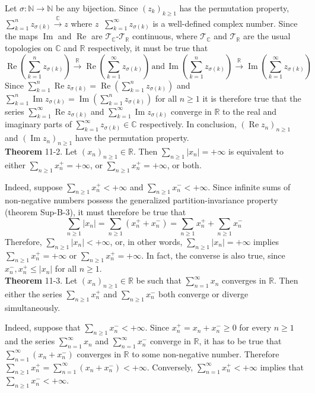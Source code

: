 \documentclass[a4paper]{article}
\newcommand{\brac}[1]{\left ( #1 \right )}
\newcommand{\abs}[1]{\left | #1 \right |}
\newcommand{\Real}{\mathbb{R}}
\newcommand{\Cplx}{\mathbb{C}}
\newcommand{\Tcal}{\mathcal{T}}
\newcommand{\defn}{\mathop{\overset{\Delta}{=}}\nolimits}
\newcommand{\re}{\operatorname{Re}\nolimits}
\newcommand{\im}{\operatorname{Im}\nolimits}
\begin{document}
Let $\sigma:\mathbb{N}\to\mathbb{N}$ be any bijection. Since $\brac{z_k}_{k\geq 1}$ has the permutation property, $\sum_{k=1}^n z_{\sigma\brac{k}}\overset{\Cplx}{\to} z$ where $z\defn \sum_{k=1}^\infty z_{\sigma\brac{k}}$ is a well-defined complex number. Since the maps $\im$ and $\re$ are $\Tcal_\Cplx$-$\Tcal_\Real$ continuous, where $\Tcal_\Cplx$ and $\Tcal_\Real$ are the usual topologies on $\Cplx$ and $\Real$ respectively, it must be true that \[\re\brac{\sum_{k=1}^n z_{\sigma\brac{k}}}\overset{\Real}{\to}\re\brac{\sum_{k=1}^\infty z_{\sigma\brac{k}}}\,\text{and}\,\im\brac{\sum_{k=1}^n z_{\sigma\brac{k}}}\overset{\Real}{\to}\im\brac{\sum_{k=1}^\infty z_{\sigma\brac{k}}}\] Since $\sum_{k=1}^n \re z_{\sigma\brac{k}}=\re\brac{\sum_{k=1}^n z_{\sigma\brac{k}}}$ and $\sum_{k=1}^n \im z_{\sigma\brac{k}}=\im\brac{\sum_{k=1}^n z_{\sigma\brac{k}}}$ for all $n\geq 1$ it is therefore true that the series $\sum_{k=1}^\infty \re z_{\sigma\brac{k}}$ and $\sum_{k=1}^\infty \im z_{\sigma\brac{k}}$ converge in $\Real$ to the real and imaginary parts of $\sum_{k=1}^\infty z_{\sigma\brac{k}}\in \Cplx$ respectively. In conclusion, $\brac{\re z_n}_{n\geq 1}$ and $\brac{\im z_n}_{n\geq 1}$ have the permutation property.\\

\label{thm:absolute_summation_2} \noindent \textbf{Theorem} 11-2.
Let $\brac{x_n}_{n\geq1}\in \Real$. Then $\sum_{n\geq 1} \abs{x_n}=+\infty$ is equivalent to either $\sum_{n\geq 1} x_n^+=+\infty$, or $\sum_{n\geq 1} x_n^+=+\infty$, or both.

Indeed, suppose $\sum_{n\geq 1} x_n^+<+\infty$ and $\sum_{n\geq 1} x_n^-<+\infty$. Since infinite sums of non-negative numbers possess the generalized partition-invariance property (theorem Sup-B-3), it must therefore be true that \[\sum_{n\geq 1} \abs{x_n} = \sum_{n\geq 1} \brac{x_n^++x_n^-} = \sum_{n\geq 1} x_n^+ + \sum_{n\geq 1} x_n^-\] Therefore, $\sum_{n\geq 1} \abs{x_n}<+\infty$, or, in other words, $\sum_{n\geq 1} \abs{x_n}=+\infty$ implies $\sum_{n\geq 1} x_n^+=+\infty$ or $\sum_{n\geq 1} x_n^+=+\infty$. In fact, the converse is also true, since $x_n^-,x_n^+\leq \abs{x_n}$ for all $n\geq 1$.\\

\label{thm:absolute_summation_3} \noindent \textbf{Theorem} 11-3.
Let $\brac{x_n}_{n\geq1}\in \Real$ be such that $\sum_{n=1}^\infty x_n$ converges in $\Real$. Then either the series $\sum_{n\geq 1} x_n^+$ and $\sum_{n\geq 1} x_n^-$ both converge or diverge simultaneously.

Indeed, suppose that $\sum_{n\geq 1} x_n^-<+\infty$. Since $x_n^+ = x_n + x_n^-\geq 0$ for every $n\geq 1$ and the series $\sum_{n=1}^\infty x_n$ and $\sum_{n=1}^\infty x_n^-$ converge in $\Real$, it has to be true that $\sum_{n=1}^\infty \brac{x_n+x_n^-}$ converges in $\Real$ to some non-negative number. Therefore $\sum_{n\geq 1} x_n^+ = \sum_{n=1}^\infty \brac{x_n+x_n^-}<+\infty$. Conversely, $\sum_{n=1}^\infty x_n^+<+\infty$ implies that $\sum_{n\geq 1} x_n^-<+\infty$.\\
\end{document}
